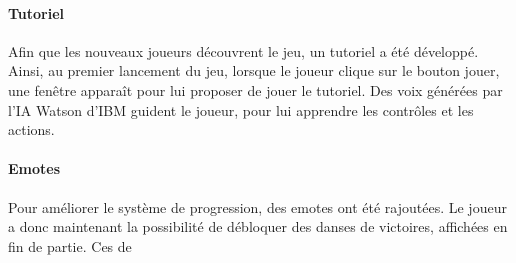 		\paragraph{Tutoriel}

			Afin que les nouveaux joueurs découvrent le jeu, un tutoriel a été développé. Ainsi, au premier lancement du jeu, lorsque le 
			joueur clique sur le bouton jouer, une fenêtre apparaît pour lui proposer de jouer le tutoriel. Des voix générées par l'IA 
			Watson d'IBM guident le joueur, pour lui apprendre les contrôles et les actions.

		\paragraph{Emotes}

			Pour améliorer le système de progression, des emotes ont été rajoutées. Le joueur a donc maintenant la possibilité de débloquer des 
			danses de victoires, affichées en fin de partie. Ces de
		
		


